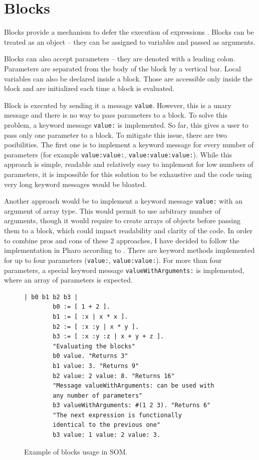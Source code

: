 \documentclass[thesis=M,english]{FITthesis}[2019/12/23]
\begin{document}
\section{Blocks}
Blocks provide a mechanism to defer the execution of expressions \cite{pharo-by-example}.
Blocks can be treated as an object -- they can be assigned to variables and
passed as arguments. 

Blocks can also accept parameters -- they are denoted with a leading colon. Parameters are separated from the body
of the block by a vertical bar. Local variables can also be declared inside a block. Those are accessible only inside
the block and are initialized each time a block is evaluated.

Block is executed by sending it a message \texttt{value}. However, this is a unary message and there is no way
to pass parameters to a block. To solve this problem, a keyword message \texttt{value:} is implemented. So far, this
gives a user to pass only one parameter to a block. To mitigate this issue, there are two posibilities. The first one
is to implement a keyword message for every number of parameters (for example \texttt{value:value:}, 
\texttt{value:value:value:}). While this approach is simple, readable and relatively easy to implement for low
numbers of parameters, it is impossible for this solution to be exhaustive and the code using very long keyword
messages would be bloated.

Another approach would be to implement a keyword message \texttt{value:} with an argument of array type. This would
permit to use arbitrary number of arguments, though it would require to create arrays of objects before passing them
to a block, which could impact readability and clarity of the code. In order to combine pros and cons of these 2
approaches, I have decided to follow the implementation in Pharo according to \cite[p.~65]{pharo-by-example}. 
There are keyword methods implemented for up to four parameters (\texttt{value:}, \texttt{value:value:}). For more
than four parameters, a special keyword message \texttt{valueWithArguments:} is implemented, where an array of
parameters is expected.

\begin{figure}[h!]
	\caption{Example of blocks usage in SOM.}
	\begin{lstlisting}[language=Smalltalk]
		| b0 b1 b2 b3 |
		b0 := [ 1 + 2 ].
		b1 := [ :x | x * x ].
		b2 := [ :x :y | x * y ].
		b3 := [ :x :y :z | x + y + z ].
		"Evaluating the blocks"
		b0 value. "Returns 3"
		b1 value: 3. "Returns 9"
		b2 value: 2 value: 8. "Returns 16"
		"Message valueWithArguments: can be used with 
		any number of parameters"
		b3 valueWithArguments: #(1 2 3). "Returns 6"
		"The next expression is functionally 
		identical to the previous one"
		b3 value: 1 value: 2 value: 3.
	\end{lstlisting}
\end{figure}
\end{document}
